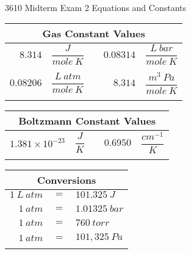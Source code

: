 \documentclass[12pt, letterpaper]{memoir}
\begin{document}
\newpage
\pagestyle{empty}

~
\vspace{-3em}
\begin{center}
	{\LARGE 3610 Midterm Exam 2 Equations and Constants}	
\end{center}

\vspace{-1em}
\begin{minipage}{0.57\linewidth}
	\begin{mdframed}
		\begin{tabular}{rlcrl}
			\multicolumn{5}{c}{Gas Constant Values}\\ \midrule
			$8.314$ & $\dfrac{J}{mole~K}$ && $0.08314$ & $\dfrac{L~bar}{mole~K}$\\ \\
			$0.08206$ & $\dfrac{L~atm}{mole~K}$ && $8.314$ & $\dfrac{m^3~Pa}{mole~K}$\\ \\
		\end{tabular}
		\begin{tabular}{rlcrl}
			\multicolumn{5}{c}{Boltzmann Constant Values}\\ \midrule
			$1.381 \times 10^{-23}$ & $\dfrac{J}{K}$ && $0.6950$ & $\dfrac{cm^{-1}}{K}$\\ \\
		\end{tabular}
	\end{mdframed}
\end{minipage}
\hspace{20pt}
\begin{minipage}{0.4\linewidth}
	\begin{mdframed}
		\begin{tabular}{rcl}
			\multicolumn{3}{c}{Conversions}\\ \midrule
			$1~L~atm $ & $=$ & $101.325~J$\\ \\
			$1~atm $ & $=$ & $1.01325~bar$\\ \\
			$1~atm $ & $=$ & $760~torr$\\ \\
			$1~atm $ & $=$ & $101,325~Pa$ \\ \\
		\end{tabular}
	\end{mdframed}	
\end{minipage}
\end{document}
